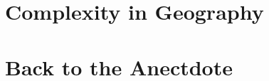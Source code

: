 
















\section*{Complexity in Geography}











\section*{Back to the Anectdote}







